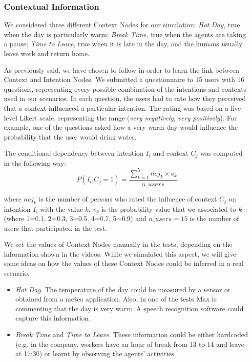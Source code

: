 \subsubsection{Contextual Information}
We considered three different Context Nodes for our simulation: \textit{Hot Day}, true when the day is particularly warm; \textit{Break Time}, true when the agents are taking a pause; \textit{Time to Leave}, true when it is late in the day, and the humans usually leave work and return home.

As previously said, we have chosen to follow \cite{Liu2014} in order to learn the link between Context and Intention Nodes. We submitted a questionnaire to 15 users with 16 questions, representing every possible combination of the intentions and contexts used in our scenarios. In each question,
the users had to rate how they perceived that a context influenced a particular intention. The rating was based on a five-level Likert scale, representing the range (\textit{very negatively}, \textit{very positively}). For example, one of the questions asked how a very warm day would influence the probability that the user would drink water.

The conditional dependency between intention $I_i$ and context $C_j$ was computed in the following way: 
\begin{equation}
 P(I_i|C_j=1)=\frac{\sum_{k=1}^5 ncj_k \times v_k}{n\_users}
\end{equation}

where $ncj_k$ is the number of persons who rated the influence of context $C_j$ on intention $I_i$ with the value $k$, $v_k$ is the probability value that we associated to $k$ (where 1=0.1, 2=0.3, 3=0.5, 4=0.7, 5=0.9) and $n\_users=15$ is the number of users that participated in the test.

We set the values of Context Nodes manually in the tests, depending  on the information shown in the videos. While we simulated this aspect, we will give some ideas on how the values of these Context Nodes could be inferred in a real scenario.

\begin{itemize}
\item \textit{Hot Day}. The temperature of the day could be measured by a sensor or obtained from a meteo application. Also, in one of the tests Max is commenting that the day is very warm. A speech recognition software could capture this information.
\item \textit{Break Time} and \textit{Time to Leave}. These information could be either hardcoded (e.g. in the company, workers have an hour of break from 13 to 14 and leave at 17:30) or learnt by observing the agents' activities.
\end{itemize}



